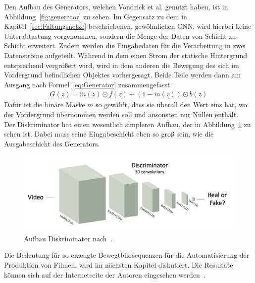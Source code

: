 \documentclass[times, 11pt,twocolumn]{article}
\begin{document}
Den Aufbau des Generators, welchen Vondrick et al. genutzt haben, ist in Abbildung~\ref{fig:generator} zu sehen. Im Gegensatz zu dem in Kapitel~\ref{sec:Faltungsnetze} beschriebenen, gewöhnlichen CNN, wird hierbei keine Unterabtastung vorgenommen, sondern die Menge der Daten von Schicht zu Schicht erweitert. Zudem werden die Eingabedaten für die Verarbeitung in zwei Datenströme aufgeteilt. Während in dem einen Strom der statische Hintergrund entsprechend vergrößert wird, wird in dem anderen die Bewegung des sich im Vordergrund befindlichen Objektes vorhergesagt. Beide Teile werden dann am Ausgang nach Formel~\ref{eq:Generator} zusammengefasst.
\footnotesize
\begin{equation}
\begin{aligned}
G(z) = m(z) \odot f(z) + (1-m(z))\odot b(z)
\end{aligned}
	\label{eq:Generator}
\end{equation}
\small
Dafür ist die binäre Maske $m$ so gewählt, dass sie überall den Wert eins hat, wo der Vordergrund übernommen werden soll und ansonsten nur Nullen enthält. \\
Der Diskriminator hat einen wesentlich simpleren Aufbau, der in Abbildung~\ref{fig:discriminator} zu sehen ist. Dabei muss seine Eingabeschicht eben so groß sein, wie die Ausgabeschicht des Generators.\\
\begin{figure}
	\flushleft
	\includegraphics[width=\columnwidth]{Bilder/discriminator.jpg}
	\caption{Aufbau Diskriminator nach~\cite{VondrickPT16}.}
	\label{fig:discriminator}
\end{figure}
Die Bedeutung für so erzeugte Bewegtbildsequenzen für die Automatisierung der Produktion von Filmen, wird im nächsten Kapitel diskutiert. Die Resultate können sich auf der Internetseite der Autoren eingesehen werden~\cite{VondrickInternet}.
\end{document}
